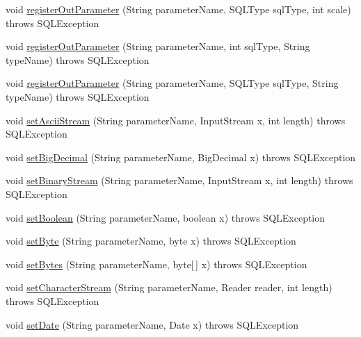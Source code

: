 \begin{DoxyCompactItemize}
void \mbox{\hyperlink{classcom_1_1mysql_1_1cj_1_1jdbc_1_1_callable_statement_a9d30fa877a6d476dc33a1bfe99ec7b2f}{register\+Out\+Parameter}} (String parameter\+Name, S\+Q\+L\+Type sql\+Type, int scale)  throws S\+Q\+L\+Exception 
\item 
void \mbox{\hyperlink{classcom_1_1mysql_1_1cj_1_1jdbc_1_1_callable_statement_a5c95bebcfabf37c4d4cf1f054e5b2278}{register\+Out\+Parameter}} (String parameter\+Name, int sql\+Type, String type\+Name)  throws S\+Q\+L\+Exception 
\item 
void \mbox{\hyperlink{classcom_1_1mysql_1_1cj_1_1jdbc_1_1_callable_statement_ad8565f92c6e3673ea330998a6f0b812d}{register\+Out\+Parameter}} (String parameter\+Name, S\+Q\+L\+Type sql\+Type, String type\+Name)  throws S\+Q\+L\+Exception 
\item 
void \mbox{\hyperlink{classcom_1_1mysql_1_1cj_1_1jdbc_1_1_callable_statement_a69641688613693dda99a792231cdb153}{set\+Ascii\+Stream}} (String parameter\+Name, Input\+Stream x, int length)  throws S\+Q\+L\+Exception 
\item 
void \mbox{\hyperlink{classcom_1_1mysql_1_1cj_1_1jdbc_1_1_callable_statement_a4a068a406dc0362622e2204d21a8e70a}{set\+Big\+Decimal}} (String parameter\+Name, Big\+Decimal x)  throws S\+Q\+L\+Exception 
\item 
void \mbox{\hyperlink{classcom_1_1mysql_1_1cj_1_1jdbc_1_1_callable_statement_a2cb01ff3839a5512f641ad8ffc72adaa}{set\+Binary\+Stream}} (String parameter\+Name, Input\+Stream x, int length)  throws S\+Q\+L\+Exception 
\item 
void \mbox{\hyperlink{classcom_1_1mysql_1_1cj_1_1jdbc_1_1_callable_statement_a8236f80a9a498f1401ee0f2ec01adcdd}{set\+Boolean}} (String parameter\+Name, boolean x)  throws S\+Q\+L\+Exception 
\item 
void \mbox{\hyperlink{classcom_1_1mysql_1_1cj_1_1jdbc_1_1_callable_statement_a212a0900b99fd7f7ddbe7a64eea6b1e4}{set\+Byte}} (String parameter\+Name, byte x)  throws S\+Q\+L\+Exception 
\item 
void \mbox{\hyperlink{classcom_1_1mysql_1_1cj_1_1jdbc_1_1_callable_statement_aaa52a01483a9d999e9c8973064a063d9}{set\+Bytes}} (String parameter\+Name, byte\mbox{[}$\,$\mbox{]} x)  throws S\+Q\+L\+Exception 
\item 
void \mbox{\hyperlink{classcom_1_1mysql_1_1cj_1_1jdbc_1_1_callable_statement_ae67b3fc2ec48f545359e93d6568ccc3b}{set\+Character\+Stream}} (String parameter\+Name, Reader reader, int length)  throws S\+Q\+L\+Exception 
\item 
void \mbox{\hyperlink{classcom_1_1mysql_1_1cj_1_1jdbc_1_1_callable_statement_ad8945fa51e3fbb56c41cea11624e726e}{set\+Date}} (String parameter\+Name, Date x)  throws S\+Q\+L\+Exception 

\end{DoxyCompactItemize}

